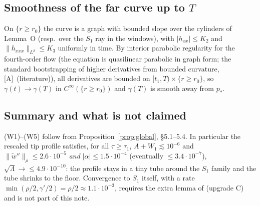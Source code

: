 \documentclass[11pt]{article}
\theoremstyle{definition}
\theoremstyle{remark}
\newcommand{\fn}[1]{\texttt{\detokenize{#1}}}
\newcommand{\tA}{\textsc{[A]}}
\newcommand{\norm}[1]{\lVert #1\rVert}
\begin{document}
\subsection{Smoothness of the far curve up to $T$}
On $\{r\ge r_0\}$ the curve is a graph with bounded slope over the cylinders of Lemma~O (resp.\ over the $S_1$ ray in the windows), with $|h_{xx}|\le K_2$ and $\norm{h_{xxx}}_{L^2}\le K_3$ uniformly in time. By interior parabolic regularity for the fourth-order flow (the equation is quasilinear parabolic in graph form; the standard bootstrapping of higher derivatives from bounded curvature, \tA\ (literature)), all derivatives are bounded on $[t_1,T)\times\{r\ge r_0\}$, so $\gamma(t)\to\gamma(T)$ in $C^\infty(\{r\ge r_0\})$ and $\gamma(T)$ is smooth away from $p_*$.

\subsection{Summary and what is not claimed}
(W1)--(W5) follow from Proposition~\ref{prop:global}, \S5.1--5.4. In particular the rescaled tip profile satisfies, for all $\tau\ge\tau_1$, $A+W_1\lesssim10^{-6}$ and $\norm{\tilde w''}_\rho\le2.6\cdot10^{-5}$ \emph{and} $|\alpha|\le1.5\cdot10^{-4}$ (eventually $\le3.4\cdot10^{-7}$), $\sqrt\Lambda\to\le4.9\cdot10^{-10}$: the profile stays in a tiny tube around the $S_1$ family and the tube shrinks to the floor. Convergence to $S_1$ itself, with a rate $\min(\rho/2,\gamma'/2)=\rho/2\approx1.1\cdot10^{-3}$, requires the extra lemma of \fn{STEP3_FIXPLAN.md} (upgrade C) and is not part of this note.
\end{document}
